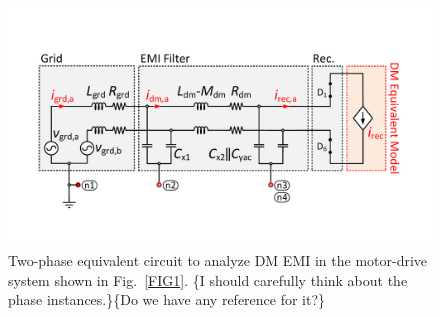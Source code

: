 \documentclass[journal,a4paper,10pt,twoside]{IEEEtran} %
\begin{document}
	\begin{figure}[t]
	    \centering
		\includegraphics[clip, trim=0cm 3cm 0cm 3cm, width=1\linewidth]{FIGS/FIG_6.pdf}
		\caption{Two-phase equivalent circuit to analyze DM EMI in the motor-drive system shown in Fig.~\ref{FIG1}. {\color{red}\{I should carefully think about the phase instances.\}}{\color{blue}\{Do we have any reference for it?\}}}
		\label{FIG6}
	\end{figure}
	
\end{document}
